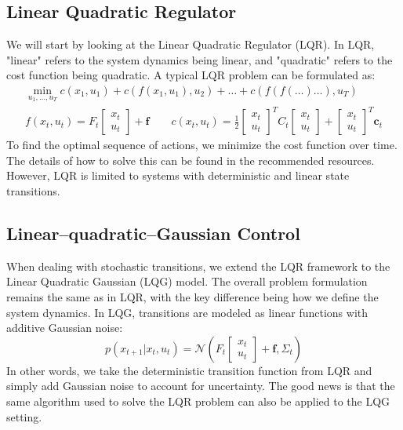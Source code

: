 \subsection{Linear Quadratic Regulator}
We will start by looking at the Linear Quadratic Regulator (LQR). In LQR, "linear" refers to 
the system dynamics being linear, and "quadratic" refers to the cost function being 
quadratic. A typical LQR problem can be formulated as:
\begin{gather*}
    \min\limits_{u_1,\dots,u_T} c(x_1,u_1)+c(f(x_1,u_1),u_2)+\dots+c(f(f(\dots)\dots),u_T) \\
    f(x_t,u_t) = F_t
\begin{bmatrix} 
x_t\\ u_t 
\end{bmatrix}
 + \mathbf{f} \qquad 
 c(x_t,u_t) = \frac{1}{2} \begin{bmatrix} 
x_t\\ u_t 
\end{bmatrix}^T C_t \begin{bmatrix} 
x_t\\ u_t 
\end{bmatrix}+ \begin{bmatrix} 
x_t\\ u_t 
\end{bmatrix}^T \mathbf{c}_t
\end{gather*}
To find the optimal sequence of actions, we minimize the cost function over time. The details of how to solve this can 
be found in the recommended resources. However, LQR is limited to systems with deterministic and linear state transitions.

\subsection{Linear–quadratic–Gaussian Control}
When dealing with stochastic transitions, we extend the LQR framework to the Linear Quadratic Gaussian (LQG) model. The overall problem 
formulation remains the same as in LQR, with the key difference being how we define the system dynamics. In LQG, transitions are modeled as 
linear functions with additive Gaussian noise:
$$p(x_{t+1}|x_t,u_t) = \mathcal{N}( F_t
\begin{bmatrix} 
x_t\\ u_t 
\end{bmatrix}
 + \mathbf{f}, \Sigma_t)$$
In other words, we take the deterministic transition function from LQR and simply add Gaussian noise to account for uncertainty. The good 
news is that the same algorithm used to solve the LQR problem can also be applied to the LQG setting. 

